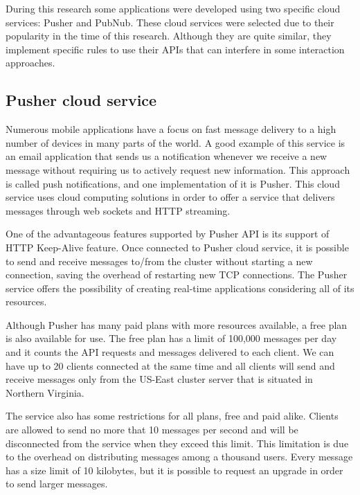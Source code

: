 During this research some applications were developed using two specific cloud services: Pusher and PubNub.
These cloud services were selected due to their popularity in the time of this research.
Although they are quite similar, they implement specific rules to use their APIs that can interfere in some interaction approaches.

\subsection*{Pusher cloud service}

Numerous mobile applications have a focus on fast message delivery to a high number of devices in many parts of the world.
A good example of this service is an email application that sends us a notification whenever we receive a new message without requiring us to actively request new information.
This approach is called push notifications, and one implementation of it is Pusher.
This cloud service uses cloud computing solutions in order to offer a service that delivers messages through web sockets and HTTP streaming.

One of the advantageous features supported by Pusher API is its support of HTTP Keep-Alive feature. 
Once connected to Pusher cloud service, it is possible to send and receive messages to/from the cluster without starting a new connection, saving the overhead of restarting new TCP connections.
The Pusher service offers the possibility of creating real-time applications considering all of its resources.

Although Pusher has many paid plans with more resources available, a free plan is also available for use.
The free plan has a limit of 100,000 messages per day and it counts the API requests and messages delivered to each client.
We can have up to 20 clients connected at the same time and all clients will send and receive messages only from the US-East cluster server that is situated in Northern Virginia.

The service also has some restrictions for all plans, free and paid alike.
Clients are allowed to send no more that 10 messages per second and will be disconnected from the service when they exceed this limit.
This limitation is due to the overhead on distributing messages among a thousand users.
Every message has a size limit of 10 kilobytes, but it is possible to request an upgrade in order to send larger messages.

